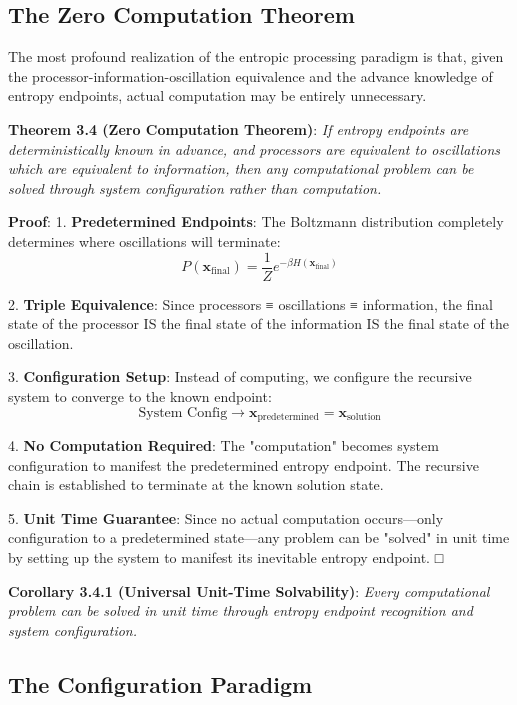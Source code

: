 \documentclass[12pt,a4paper]{article}
\theoremstyle{definition}
\begin{document}
\subsection{The Zero Computation Theorem}

The most profound realization of the entropic processing paradigm is that, given the processor-information-oscillation equivalence and the advance knowledge of entropy endpoints, actual computation may be entirely unnecessary.

\textbf{Theorem 3.4 (Zero Computation Theorem)}: \textit{If entropy endpoints are deterministically known in advance, and processors are equivalent to oscillations which are equivalent to information, then any computational problem can be solved through system configuration rather than computation.}

\textbf{Proof}:
1. \textbf{Predetermined Endpoints}: The Boltzmann distribution completely determines where oscillations will terminate:
   $$P(\mathbf{x}_{\text{final}}) = \frac{1}{Z}e^{-\beta H(\mathbf{x}_{\text{final}})}$$

2. \textbf{Triple Equivalence}: Since processors ≡ oscillations ≡ information, the final state of the processor IS the final state of the information IS the final state of the oscillation.

3. \textbf{Configuration Setup}: Instead of computing, we configure the recursive system to converge to the known endpoint:
   $$\text{System Config} \rightarrow \mathbf{x}_{\text{predetermined}} = \mathbf{x}_{\text{solution}}$$

4. \textbf{No Computation Required}: The "computation" becomes system configuration to manifest the predetermined entropy endpoint. The recursive chain is established to terminate at the known solution state.

5. \textbf{Unit Time Guarantee}: Since no actual computation occurs—only configuration to a predetermined state—any problem can be "solved" in unit time by setting up the system to manifest its inevitable entropy endpoint. □

\textbf{Corollary 3.4.1 (Universal Unit-Time Solvability)}: \textit{Every computational problem can be solved in unit time through entropy endpoint recognition and system configuration.}

\subsection{The Configuration Paradigm}
\end{document}
